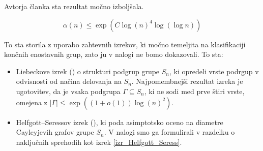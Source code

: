 Avtorja članka \cite{Kozma_Thom_2016} sta rezultat močno izboljšala.
\begin{izrek}\label{izr_kozma_thom_glavni}
    \begin{equation}\label{eq_kozma_thom}
        \alpha(n)  \le \exp(C \log(n)^4 \log (\log n))
    \end{equation}
\end{izrek}
To sta storila z uporabo zahtevnih izrekov, ki močno temeljita na klasifikaciji končnih enostavnih grup, zato ju v nalogi ne bomo dokazovali. To sta:
\begin{itemize}
    \item Liebeckove izrek (\cite{Liebeck_1984}) o strukturi podgrup grupe $S_n$, ki opredeli vrste podrgup v odvisnosti od načina delovanja na $S_n$. Najpomembnejši rezultat izreka je ugotovitev, da je vsaka podgrupa $\Gamma \subseteq  S_n$, ki ne sodi med prve štiri vrste, omejena z $\lvert \Gamma \rvert \le \exp((1 + o(1)) \log(n)^2)$. 
    \item Helfgott--Seressov izrek (\cite{Helfgott_Seress_2013}), ki poda asimptotsko oceno na diametre Cayleyjevih grafov grupe $S_n$. V nalogi smo ga formulirali v razdelku o naključnih sprehodih kot izrek \ref{izr_Helfgott_Seress}.
\end{itemize} 

